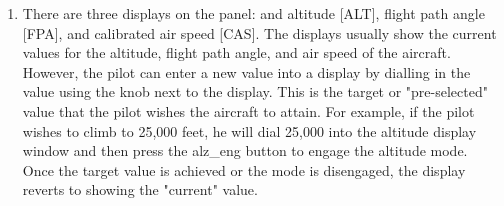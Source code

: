 \documentclass{article}
\begin{document}
\begin{enumerate}
\begin{schema}{AutoPilot}
 \\
 \\
 \\
\end{schema}

\begin{schema}{AutoPilot'}
 \\
 \\
 \\
\end{schema}



\begin{schema}{att\_cwsDo}
\where
{}\\
 \\
 \\
 \\
\end{schema}


\item There are three displays on the panel: and altitude [ALT], flight path angle [FPA], and
calibrated air speed [CAS]. The displays usually show the current values for the altitude, flight
path angle, and air speed of the aircraft. However, the pilot can enter a new value into a display by
dialling in the value using the knob next to the display. This is the target or "pre-selected" value that
the pilot wishes the aircraft to attain. For example, if the pilot wishes to climb to 25,000 feet, he 
will dial 25,000 into the altitude display window and then press the alz\_eng button to engage the 
altitude mode. Once the target value is achieved or the mode is disengaged, the display reverts to 
showing the "current" value.


\end{enumerate}
\end{document}
